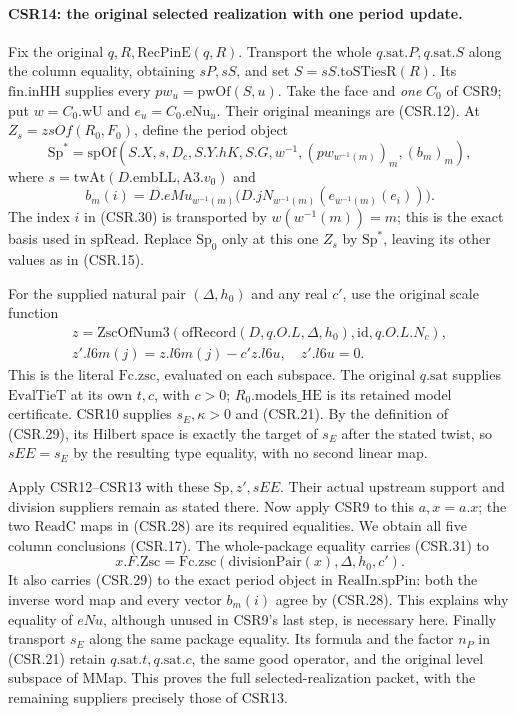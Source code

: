 \paragraph{CSR14: the original selected realization with one period update.}
\label{claim:CSR14}
Fix the original \(q,R,\mathrm{RecPinE}(q,R)\). Transport the
whole \(q.\mathrm{sat}.P,q.\mathrm{sat}.S\) along the column
equality, obtaining \(sP,sS\), and set \(S=sS.\mathrm{toSTiesR}(R)\).
Its \(\mathrm{fin.inHH}\) supplies every \(pw_u=\mathrm{pwOf}(S,u)\).
Take the face and \emph{one} \(C_0\) of CSR9; put
\(w=\!C_0.\mathrm{wU}\) and \(e_u=\!C_0.\mathrm{eNu}_u\).
Their original meanings are (CSR.12).
At \(Z_s=zsOf(R_0,F_0)\), define the period object
\[
 \mathrm{Sp}^{*}=\mathrm{spOf}
 \left(S.X,s,D_c,S.Y.hK,S.G,w^{-1},
            (pw_{w^{-1}(m)})_m,(b_m)_m\right),
 \tag{CSR.29}
\]
where \(s=\mathrm{twAt}(D.\mathrm{embLL},\mathrm{A3}.v_0)\) and
\[
 b_m(i)=D.eMu_{w^{-1}(m)}
        \bigl(D.jN_{w^{-1}(m)}
          (e_{w^{-1}(m)}(e_i))\bigr).
 \tag{CSR.30}
\]
The index \(i\) in (CSR.30) is transported by
\(w(w^{-1}(m))=m\); this is the exact basis used in
\(\mathrm{spRead}\). Replace \(\mathrm{Sp}_0\) only at this
one \(Z_s\) by \(\mathrm{Sp}^{*}\), leaving its other values
as in (CSR.15).

For the supplied natural pair \((\Delta,h_0)\) and any real \(c'\),
use the original scale function
\[
 \begin{gathered}
 z=\mathrm{ZscOfNum3}
       (\mathrm{ofRecord}(D,q.O.L,\Delta,h_0),
        \mathrm{id},q.O.L.N_c),\\
 z'.l6m(j)=z.l6m(j)-c' z.l6u,\quad z'.l6u=0 .
 \end{gathered}
 \tag{CSR.31}
\]
This is the literal \(\mathrm{Fc.zsc}\), evaluated on each
subspace. The original \(q.\mathrm{sat}\) supplies
\(\mathrm{EvalTieT}\) at its own \(t,c\), with \(c>0\);
\(R_0.\mathrm{models\_HE}\) is its retained model certificate.
CSR10 supplies \(s_E,\kappa>0\) and (CSR.21).
By the definition of (CSR.29), its Hilbert space is exactly
the target of \(s_E\) after the stated twist, so \(sEE=s_E\)
by the resulting type equality, with no second linear map.

Apply CSR12--CSR13 with these \(\mathrm{Sp},z',sEE\).
Their actual upstream support and division suppliers remain
as stated there. Now apply CSR9 to this \(a,x=a.x\);
the two \(\mathrm{ReadC}\) maps in (CSR.28) are its required
equalities. We obtain all five column conclusions (CSR.17).
The whole-package equality carries (CSR.31) to
\[
        x.F.\mathrm{Zsc}
             =\mathrm{Fc.zsc}(\mathrm{divisionPair}(x),
                                      \Delta,h_0,c').
 \tag{CSR.32}
\]
It also carries (CSR.29) to the exact period object in
\(\mathrm{RealIn.spPin}\): both the inverse word map and every
vector \(b_m(i)\) agree by (CSR.28). This explains why equality
of \(eNu\), although unused in CSR9's last step, is necessary here.
Finally transport \(s_E\) along the same package equality.
Its formula and the factor \(n_P\) in (CSR.21) retain
\(q.\mathrm{sat}.t,q.\mathrm{sat}.c\), the same good operator,
and the original level subspace of \(\mathrm{MMap}\).
This proves the full selected-realization packet, with the
remaining suppliers precisely those of CSR13.

